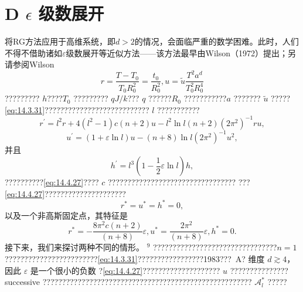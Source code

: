 \section{\texorpdfstring{D \(\epsilon\) 级数展开}{D \textbackslash epsilon 级数展开}}\label{d-epsilon-ux7ea7ux6570ux5c55ux5f00}
将RG方法应用于高维系统，即\(d > 2\)的情况，会面临严重的数学困难。此时，人们不得不借助诸如\(\varepsilon\)级数展开等近似方法——该方法最早由Wilson（1972）提出；另请参阅Wilson
\begin{equation}\tag{14.4.26}\label{eq:14.4.26}
r = \frac { T - T _ { 0 } } { T _ { 0 } R _ { 0 } ^{2} } = \frac { t _ { 0 } } { R _ { 0 } ^{2} } ,  u = \tilde { u } \frac { T ^{2} a ^{d} } { T _ { 0 } ^{2} R _ { 0 } ^{4} }
\end{equation}
????????? \(h\)????\(T_0\) ????????? \(qJ/k\)??? \(q\) ??????\(R_0\) ???????????\(a\) ??????? \(\tilde{u}\) ?????\autoref{eq:14.3.31}??????????????????????????? \(l\) ???????????
\begin{equation}\tag{14.4.27}\label{eq:14.4.27}
r ^{\prime} = l ^{2} r + 4 ( l ^{2} - 1 ) c ( n + 2 ) u - l ^{2} \ln l ( n + 2 ) ( 2 \pi ^{2} ) ^{- 1} r u ,
\end{equation}
\begin{equation}\tag{14.4.28}\label{eq:14.4.28}
u ^{\prime} = ( 1 + \varepsilon \ln l ) u - ( n + 8 ) \ln l ( 2 \pi ^{2} ) ^{- 1} u ^{2} ,
\end{equation}
并且
\begin{equation}\tag{14.4.29}\label{eq:14.4.29}
h ^{\prime} = l ^{3} \left( 1 - \frac { 1 } { 2 } \varepsilon \ln l \right) h ,
\end{equation}
??????????\autoref{eq:14.4.27}???? \(c\) ?????????????????????????????????
???\autoref{eq:14.4.27}?????????????????????
\begin{equation}\tag{14.4.30}\label{eq:14.4.30}
r ^{*} = u ^{*} = h ^{*} = 0 ,
\end{equation}
以及一个非高斯固定点，其特征是
\begin{equation}\tag{14.4.31}\label{eq:14.4.31}
r ^{*} = - \frac { 8 \pi ^{2} c ( n + 2 ) } { ( n + 8 ) } \varepsilon ,  u ^{*} = \frac { 2 \pi ^{2} } { ( n + 8 ) } \varepsilon ,  h ^{*} = 0 .
\end{equation}
接下来，我们来探讨两种不同的情形。
\(^{9}\) ????????????????????????????????\(n=1\)????????????????????????\autoref{eq:14.3.31}?????????????????1983???~A?
维度 \(d \gtrsim 4\)，因此 \(\varepsilon\) 是一个很小的负数
?\autoref{eq:14.4.27}???????????????????? \(u\) ??????????????? successive ?????????????????????????????????????????????????????? \(\mathcal{A}_l^*\) ?????
